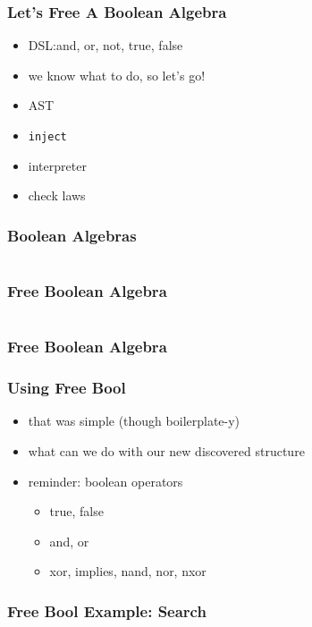 \documentclass{beamer}
\newcommand{\recipe}{%
  \begin{itemize}
  \item AST
  \item \texttt{inject}
  \item interpreter
  \item check laws
  \end{itemize}
}
\begin{document}
\begin{frame}
  \frametitle{Let's Free A Boolean Algebra}
  \begin{itemize}
  \item DSL:\@ and, or, not, true, false
  \item we know what to do, so let's go!
  \end{itemize}
  \recipe{}
\end{frame}

\begin{frame}
  \frametitle{Boolean Algebras}
  \inputminted{scala}{snippets/boolean-algebra.scala}
\end{frame}

\begin{frame}
  \frametitle{Free Boolean Algebra}
  \inputminted{scala}{snippets/free-bool.scala}
\end{frame}

\begin{frame}
  \frametitle{Free Boolean Algebra}
\end{frame}

\begin{frame}
  \frametitle{Using Free Bool}
  \begin{itemize}
  \item that was simple (though boilerplate-y)
  \item what can we do with our new discovered structure
  \item reminder: boolean operators
    \begin{itemize}
    \item true, false
    \item and, or
    \item xor, implies, nand, nor, nxor
    \end{itemize}
  \end{itemize}
\end{frame}

\begin{frame}
  \frametitle{Free Bool Example: Search}
  \inputminted{scala}{snippets/search-predicate.scala}
\end{frame}
\end{document}
